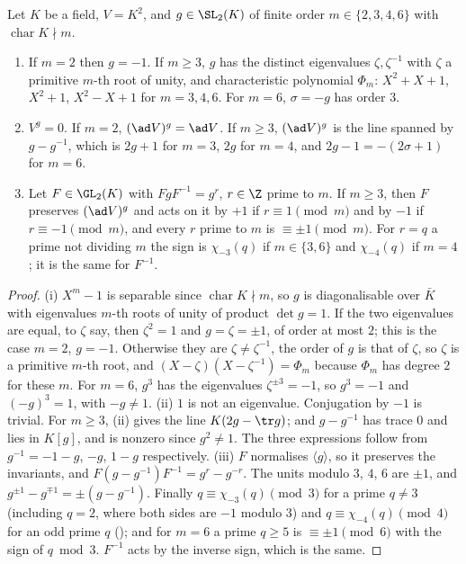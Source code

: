 \begin{proposition}\label{prop:reps:cyclic-shapes}
Let $K$ be a field, $V=K^2$, and $g\in\SL_2(K)$ of finite order $m\in\{2,3,4,6\}$ with $\operatorname{char}K\nmid m$.
\begin{enumerate}[label=(\roman*)]
\item If $m=2$ then $g=-1$. If $m\ge3$, $g$ has the distinct eigenvalues $\zeta,\zeta^{-1}$ with $\zeta$ a primitive $m$-th root of unity, and characteristic
polynomial $\Phi_m$: $X^2+X+1$, $X^2+1$, $X^2-X+1$ for $m=3,4,6$. For $m=6$, $\sigma=-g$ has order $3$.
\item $V^g=0$. If $m=2$, $(\ad V)^g=\ad V$. If $m\ge3$, $(\ad V)^g$ is the line spanned by $g-g^{-1}$, which is $2g+1$ for $m=3$, $2g$ for $m=4$, and
$2g-1=-(2\sigma+1)$ for $m=6$.
\item Let $F\in\GL_2(K)$ with $FgF^{-1}=g^r$, $r\in\Z$ prime to $m$. If $m\ge3$, then $F$ preserves $(\ad V)^g$ and acts on it by $+1$ if $r\equiv1\pmod m$ and by
$-1$ if $r\equiv-1\pmod m$, and every $r$ prime to $m$ is $\equiv\pm1\pmod m$. For $r=q$ a prime not dividing $m$ the sign is $\chi_{-3}(q)$ if
$m\in\{3,6\}$ and $\chi_{-4}(q)$ if $m=4$; it is the same for $F^{-1}$.
\end{enumerate}
\end{proposition}

\begin{proof}
(i) $X^m-1$ is separable since $\operatorname{char}K\nmid m$, so $g$ is diagonalisable over $\bar K$ with eigenvalues $m$-th roots of unity of product
$\det g=1$. If the two eigenvalues are equal, to $\zeta$ say, then $\zeta^2=1$ and $g=\zeta=\pm1$, of order at most $2$; this is the case $m=2$, $g=-1$. Otherwise
they are $\zeta\ne\zeta^{-1}$, the order of $g$ is that of $\zeta$, so $\zeta$ is a primitive $m$-th root, and $(X-\zeta)(X-\zeta^{-1})=\Phi_m$ because $\Phi_m$ has degree $2$
for these $m$. For $m=6$, $g^3$ has the eigenvalues $\zeta^{\pm3}=-1$, so $g^3=-1$ and $(-g)^3=1$, with $-g\ne1$.
(ii) $1$ is not an eigenvalue. Conjugation by $-1$ is trivial. For $m\ge3$, (ii) gives the line $K(2g-\tr g)$; and $g-g^{-1}$
has trace $0$ and lies in $K[g]$, and is nonzero since $g^2\ne1$. The three expressions follow from $g^{-1}=-1-g$, $-g$, $1-g$ respectively.
(iii) $F$ normalises $\langle g\rangle$, so it preserves the invariants, and $F(g-g^{-1})F^{-1}=g^r-g^{-r}$. The units modulo $3$, $4$, $6$ are $\pm1$, and
$g^{\pm1}-g^{\mp1}=\pm(g-g^{-1})$. Finally $q\equiv\chi_{-3}(q)\pmod3$ for a prime $q\ne3$ (including $q=2$, where both sides are $-1$ modulo $3$) and $q\equiv\chi_{-4}(q)\pmod4$ for an odd
prime $q$ (); and for $m=6$ a prime $q\ge5$ is $\equiv\pm1\pmod6$ with the sign of $q\bmod3$. $F^{-1}$ acts by the inverse sign, which is the same.
\end{proof}

